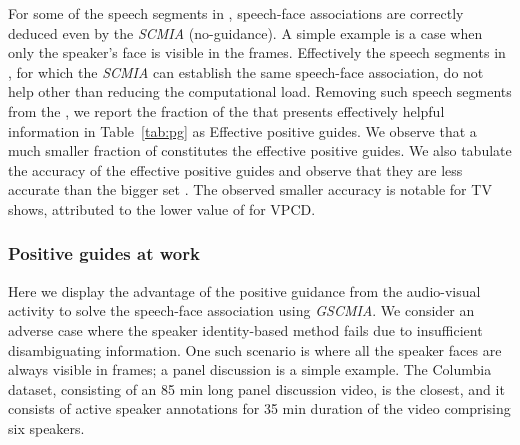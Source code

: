 For some of the speech segments in , speech-face associations are correctly deduced even by the \emph{SCMIA} (no-guidance). A simple example is a case when only the speaker's face is visible in the frames. Effectively the speech segments in , for which the \emph{SCMIA} can establish the same speech-face association, do not help other than reducing the computational load. Removing such speech segments from the , we report the fraction of the  that presents effectively helpful information in Table~\ref{tab:pg} as Effective positive guides.  We observe that a much smaller fraction of  constitutes the effective positive guides.
We also tabulate the accuracy of the effective positive guides and observe that they are less accurate than the bigger set . The observed smaller accuracy is notable for TV shows, attributed to the lower value of  for VPCD. 
\begin{table}[]
\centering
\caption{Constituents of positive and effective positive guides and their exactness. All values are shown in \%.}
\label{tab:pg}
\end{table}


\subsubsection{Positive guides at work}
Here we display the advantage of the positive guidance from the audio-visual activity to solve the speech-face association using \emph{GSCMIA}. We consider an adverse case where the speaker identity-based method fails due to insufficient disambiguating information. One such scenario is where all the speaker faces are always visible in frames; a panel discussion is a simple example. The Columbia dataset, consisting of an 85 min long panel discussion video, is the closest, and it consists of active speaker annotations for 35 min duration of the video comprising six speakers.

